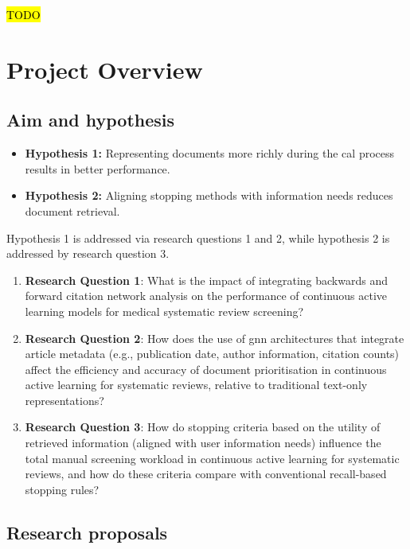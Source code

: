 \documentclass[10pt,oneside]{book}
\begin{document}
\hl{TODO}

\chapter{Project Overview}\label{sec:Project_Overview}

\section{Aim and hypothesis}

\begin{itemize}
    \item \textbf{Hypothesis 1:} Representing documents more richly during the \gls*{cal} process results in better performance.
    \item \textbf{Hypothesis 2:} Aligning stopping methods with information needs reduces document retrieval.
\end{itemize}

Hypothesis 1 is addressed via research questions 1 and 2, while hypothesis 2 is addressed by research question 3.

\begin{enumerate}
    \item \textbf{Research Question 1}: What is the impact of integrating backwards and forward citation network analysis on the performance of continuous active learning models for medical systematic review screening?
    \item \textbf{Research Question 2}: How does the use of \gls*{gnn} architectures that integrate article metadata (e.g., publication date, author information, citation counts) affect the efficiency and accuracy of document prioritisation in continuous active learning for systematic reviews, relative to traditional text-only representations?
    \item \textbf{Research Question 3}: How do stopping criteria based on the utility of retrieved information (aligned with user information needs) influence the total manual screening workload in continuous active learning for systematic reviews, and how do these criteria compare with conventional recall-based stopping rules?
\end{enumerate}

\section{Research proposals}\label{sec:research_proposals}
\end{document}
